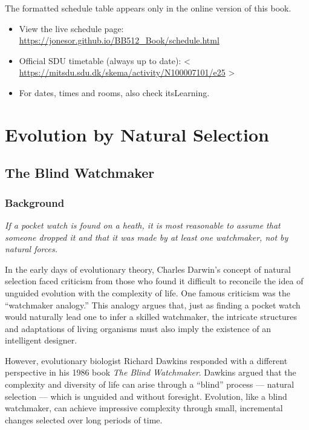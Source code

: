 \documentclass[
  a4paper]{book}
\providecommand{\tightlist}{%
  \setlength{\itemsep}{0pt}\setlength{\parskip}{0pt}}
\begin{document}
The formatted schedule table appears only in the online version of this book.

\begin{itemize}
\tightlist
\item
  View the live schedule page: \url{https://jonesor.github.io/BB512_Book/schedule.html}
\item
  Official SDU timetable (always up to date): \textless{} \url{https://mitsdu.sdu.dk/skema/activity/N100007101/e25} \textgreater{}
\item
  For dates, times and rooms, also check itsLearning.
\end{itemize}

\part{Evolution by Natural Selection}\label{part-evolution-by-natural-selection}

\chapter{The Blind Watchmaker}\label{the-blind-watchmaker}

\section{Background}\label{background}

\emph{If a pocket watch is found on a heath, it is most reasonable to assume that someone dropped it and that it was made by at least one watchmaker, not by natural forces.}

In the early days of evolutionary theory, Charles Darwin's concept of natural selection faced criticism from those who found it difficult to reconcile the idea of unguided evolution with the complexity of life. One famous criticism was the ``watchmaker analogy.'' This analogy argues that, just as finding a pocket watch would naturally lead one to infer a skilled watchmaker, the intricate structures and adaptations of living organisms must also imply the existence of an intelligent designer.

However, evolutionary biologist Richard Dawkins responded with a different perspective in his 1986 book \emph{The Blind Watchmaker}. Dawkins argued that the complexity and diversity of life can arise through a ``blind'' process --- natural selection --- which is unguided and without foresight. Evolution, like a blind watchmaker, can achieve impressive complexity through small, incremental changes selected over long periods of time.
\end{document}
